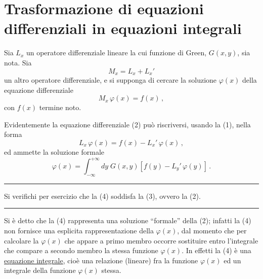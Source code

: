 \documentclass[11pt, a4paper]{book}
\numberwithin{equation}{section}
\begin{document}
\section{Trasformazione di equazioni differenziali in equazioni integrali}

Sia $L_x$ un operatore differenziale lineare la cui funzione di Green, $G(x,y)$, sia nota. Sia
\begin{equation}
\tag{1} M_x = L_x + L_x'
\end{equation}
un altro operatore differenziale, e si supponga di cercare la soluzione $\varphi(x)$ della equazione differenziale
\begin{equation}
\tag{2} M_x\,\varphi(x) = f(x)\,,
\end{equation}
con $f(x)$ termine noto.

Evidentemente la equazione differenziale (2) può riscriversi, usando la (1), nella forma
\begin{equation}
\tag{3} L_x\,\varphi(x) = f(x) - L_x'\,\varphi(x)\,,
\end{equation}
ed ammette la soluzione formale
\begin{equation}
\tag{4} \varphi(x) = \int_{-\infty}^{+\infty} dy\; G(x,y)\left[f(y) - L_y'\,\varphi(y)\right]\,.
\end{equation}

\noindent\rule{\linewidth}{0.4pt}

\noindent Si verifichi per esercizio che la (4) soddisfa la (3), ovvero la (2).

\noindent\rule{\linewidth}{0.4pt}

Si è detto che la (4) rappresenta una soluzione ``formale'' della (2); infatti la (4) non fornisce una esplicita rappresentazione della $\varphi(x)$, dal momento che per calcolare la $\varphi(x)$ che appare a primo membro occorre sostituire entro l'integrale che compare a secondo membro la stessa funzione $\varphi(x)$. In effetti la (4) è una \underline{equazione integrale}, cioè una relazione (lineare) fra la funzione $\varphi(x)$ ed un integrale della funzione $\varphi(x)$ stessa.

\end{document}
